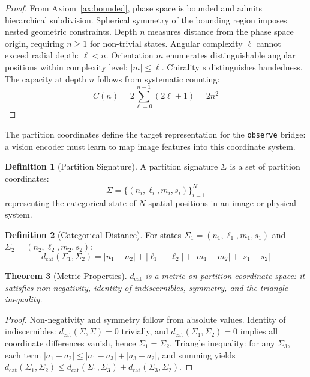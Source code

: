 \documentclass[11pt,a4paper]{article}
\newtheorem{theorem}{Theorem}[section]
\theoremstyle{definition}
\newtheorem{definition}[theorem]{Definition}
\theoremstyle{remark}
\newcommand{\dcat}{d_{\mathrm{cat}}}
\newcommand{\Sig}{\Sigma}
\begin{document}
\begin{proof}
From Axiom~\ref{ax:bounded}, phase space is bounded and admits hierarchical subdivision. Spherical symmetry of the bounding region imposes nested geometric constraints. Depth $n$ measures distance from the phase space origin, requiring $n \geq 1$ for non-trivial states. Angular complexity $\ell$ cannot exceed radial depth: $\ell < n$. Orientation $m$ enumerates distinguishable angular positions within complexity level: $|m| \leq \ell$. Chirality $s$ distinguishes handedness. The capacity at depth $n$ follows from systematic counting:
\begin{equation}
C(n) = 2\sum_{\ell=0}^{n-1}(2\ell + 1) = 2n^2
\end{equation}
\end{proof}

The partition coordinates define the target representation for the \texttt{observe} bridge: a vision encoder must learn to map image features into this coordinate system.

\begin{definition}[Partition Signature]
\label{def:signature}
A partition signature $\Sig$ is a set of partition coordinates:
\begin{equation}
\Sig = \{(n_i, \ell_i, m_i, s_i)\}_{i=1}^{N}
\end{equation}
representing the categorical state of $N$ spatial positions in an image or physical system.
\end{definition}

\begin{definition}[Categorical Distance]
\label{def:cat_distance}
For states $\Sig_1 = (n_1, \ell_1, m_1, s_1)$ and $\Sig_2 = (n_2, \ell_2, m_2, s_2)$:
\begin{equation}
\dcat(\Sig_1, \Sig_2) = |n_1 - n_2| + |\ell_1 - \ell_2| + |m_1 - m_2| + |s_1 - s_2|
\end{equation}
\end{definition}

\begin{theorem}[Metric Properties]
$\dcat$ is a metric on partition coordinate space: it satisfies non-negativity, identity of indiscernibles, symmetry, and the triangle inequality.
\end{theorem}

\begin{proof}
Non-negativity and symmetry follow from absolute values. Identity of indiscernibles: $\dcat(\Sig, \Sig) = 0$ trivially, and $\dcat(\Sig_1, \Sig_2) = 0$ implies all coordinate differences vanish, hence $\Sig_1 = \Sig_2$. Triangle inequality: for any $\Sig_3$, each term $|a_1 - a_2| \leq |a_1 - a_3| + |a_3 - a_2|$, and summing yields $\dcat(\Sig_1, \Sig_2) \leq \dcat(\Sig_1, \Sig_3) + \dcat(\Sig_3, \Sig_2)$.
\end{proof}
\end{document}
